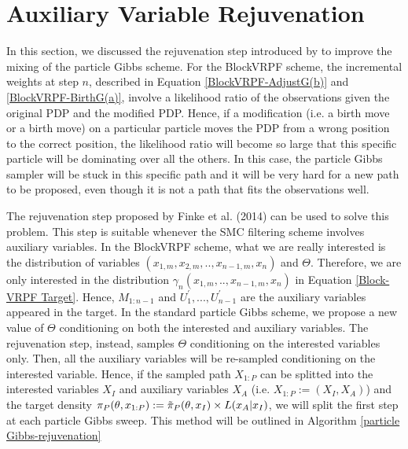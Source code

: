 \documentclass[12pt,a4paper]{article}
\begin{document}
\section{Auxiliary Variable Rejuvenation}
In this section, we discussed the rejuvenation step introduced by \cite{finke2014static} to improve the mixing of the particle Gibbs scheme. For the BlockVRPF scheme, the incremental weights at step $n$, described in Equation \eqref{BlockVRPF-AdjustG(b)} and \eqref{BlockVRPF-BirthG(a)}, involve a likelihood ratio of the observations given the original PDP and the modified PDP. Hence, if a modification (i.e. a birth move or a birth move) on a particular particle moves the PDP from a wrong position to the correct position, the likelihood ratio will become so large that this specific particle will be dominating over all the others. In this case, the particle Gibbs sampler will be stuck in this specific path and it will be very hard for a new path to be proposed, even though it is not a path that fits the observations well. 

The rejuvenation step proposed by Finke et al. (2014) can be used to solve this problem. This step is suitable whenever the SMC filtering scheme involves auxiliary variables. In the BlockVRPF scheme, what we are really interested is the distribution of variables $(x_{1,m},x_{2,m},..,x_{n-1,m},x_n)$ and $\Theta$. Therefore, we are only interested in the distribution $\gamma_{n}(x_{1,m},..,\allowbreak x_{n-1,m},x_n)$ in Equation \eqref{Block-VRPF Target}. Hence, $M_{1:n-1}$ and $U_1^{'},...,U_{n-1}^{'}$ are the auxiliary variables appeared in the target. In the standard particle Gibbs scheme, we propose a new value of $\Theta$ conditioning on both the interested and auxiliary variables. The rejuvenation step, instead, samples $\Theta$ conditioning on the interested variables only. Then, all the auxiliary variables will be re-sampled conditioning on the interested variable. Hence, if the sampled path $X_{1:P}$ can be splitted into the interested variables $X_I$ and auxiliary variables $X_A$ (i.e. $X_{1:P} := (X_I,X_A)$) and the target density $\pi_{P}(\theta,x_{1:P}) := \Tilde{\pi}_P(\theta,x_I)\times L(x_A|x_I)$, we will split the first step at each particle Gibbs sweep. This method will be outlined in Algorithm \ref{particle Gibbs-rejuvenation}
\end{document}
